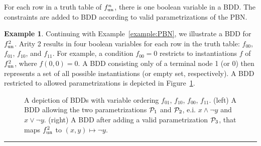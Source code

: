 \documentclass[
	digital, oneside, nosansbold, nocolorbold, nolot, nolof
]{fithesis4}
\theoremstyle{definition}
\theoremstyle{definition}
\newtheorem{example}{Example}
\newenvironment{lexample}
    {\begin{example}}
    {\par\hspace{\stretch{1}}\rule{0.2\textwidth}{0.01ex}\hspace{\stretch{1}}
     \par\end{example}}
\begin{document}
For each row in a truth table of $f_{\textrm{un}}^n$, there is one boolean variable in
a BDD. The constraints are added to BDD according to valid parametrizations of
the PBN.
\begin{lexample}
Continuing with Example~\ref{example:PBN}, we illustrate a BDD for $f_{\textrm{un}}^2$.
Arity 2 results in four boolean variables for each row in the truth table:
$f_{00}$, $f_{01}$, $f_{10}$, and $f_{11}$. For example, a condition $f_{00} =
0$ restricts to instantiations $f$ of $f_{\textrm{un}}^2$, where $f(0, 0) = 0$. A BDD
consisting only of a terminal node 1 (or 0) then represents a set of all
possible instantiations (or empty set, respectively). A BDD restricted to
allowed parametrizations is depicted in Figure~\ref{fig:BDD}.

\begin{figure}[!ht]
\centering
\begin{subfigure}{0.45\textwidth}
\centering
{}
\end{subfigure}
\hfill
\begin{subfigure}{0.45\textwidth}
\centering
{}
\end{subfigure}
\caption{A depiction of BDDs with variable ordering $f_{01}$, $f_{10}$,
    $f_{00}$, $f_{11}$. (left) A BDD allowing the two parametrizations
    $\mathcal{P}_1$ and $\mathcal{P}_2$, e.i. $x \land \lnot y$ and $x \lor \lnot
    y$.  (right) A BDD after adding a valid parametrization $\mathcal{P}_3$, that
    maps $f_{\textrm{un}}^2$ to $(x, y) \mapsto \lnot y$.}
\label{fig:BDD}
\end{figure}
\end{lexample}
\end{document}
